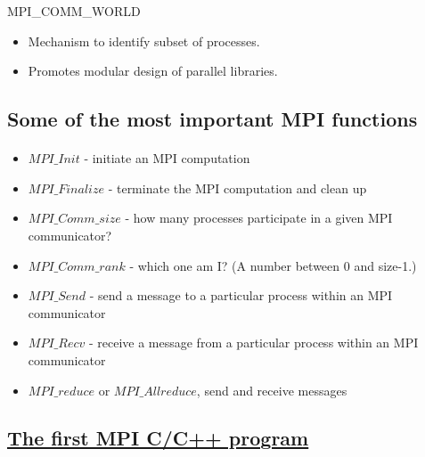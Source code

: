 \documentclass[%
oneside,                 %
final,                   %
10pt]{article}
\begin{document}
\noindent
\bcppcod
  MPI_COMM_WORLD 
\ecppcod
\begin{itemize}
\item Mechanism to identify subset of processes.

\item Promotes modular design of parallel libraries.
\end{itemize}

\noindent




\subsection{Some of the most  important MPI functions}

\paragraph{}



\begin{itemize}
\item $MPI\_Init$ - initiate an MPI computation

\item $MPI\_Finalize$ - terminate the MPI computation and clean up

\item $MPI\_Comm\_size$ - how many processes participate in a given MPI communicator?

\item $MPI\_Comm\_rank$ - which one am I? (A number between 0 and size-1.)

\item $MPI\_Send$ - send a message to a particular process within an MPI communicator

\item $MPI\_Recv$ - receive a message from a particular process within an MPI communicator

\item $MPI\_reduce$  or $MPI\_Allreduce$, send and receive messages
\end{itemize}

\noindent




\subsection{\href{{https://github.com/CompPhysics/ComputationalPhysics2/blob/gh-pages/doc/Programs/LecturePrograms/programs/MPI/chapter07/program2.cpp}}{The first MPI C/C++ program}}
\end{document}

